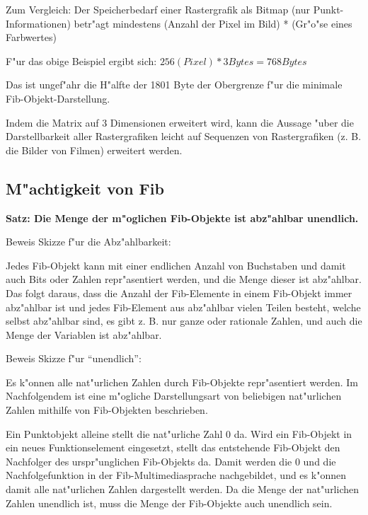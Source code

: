 \begin{flushleft}
\bigskip\noindent
Zum Vergleich: Der Speicherbedarf einer Rastergrafik als Bitmap (nur Punkt-Informationen) betr"agt mindestens
(Anzahl der Pixel im Bild) * (Gr"o"se eines Farbwertes)

\bigskip\noindent
F"ur das obige Beispiel ergibt sich: $256 (Pixel) * 3 Bytes = 768 Bytes$

\bigskip\noindent
Das ist ungef"ahr die H"alfte der 1801 Byte der Obergrenze f"ur die minimale Fib-Objekt-Darstellung.

\bigskip\noindent
Indem die Matrix auf 3 Dimensionen erweitert wird, kann die Aussage "uber die Darstellbarkeit aller Rastergrafiken leicht auf Sequenzen von Rastergrafiken (z. B. die Bilder von Filmen) erweitert werden.

\end{flushleft}


\subsection{M"achtigkeit von Fib}

\textbf{Satz: Die Menge der m"oglichen Fib-Objekte ist abz"ahlbar unendlich.}

\bigskip\noindent
Beweis Skizze f"ur die Abz"ahlbarkeit:

\noindent
Jedes Fib-Objekt kann mit einer endlichen Anzahl von Buchstaben und damit auch Bits oder Zahlen repr"asentiert werden, und die Menge dieser ist abz"ahlbar.
Das folgt daraus, dass die Anzahl der Fib-Elemente in einem Fib-Objekt immer abz"ahlbar ist und jedes Fib-Element aus abz"ahlbar vielen Teilen besteht, welche selbst abz"ahlbar sind, es gibt z. B. nur ganze oder rationale Zahlen, und auch die Menge der Variablen ist abz"ahlbar.

\bigskip\noindent
Beweis Skizze f"ur ``unendlich'':

\noindent
Es k"onnen alle nat"urlichen Zahlen durch Fib-Objekte repr"asentiert werden. Im Nachfolgendem ist eine m"ogliche Darstellungsart von beliebigen nat"urlichen Zahlen mithilfe von Fib-Objekten beschrieben.

Ein Punktobjekt alleine stellt die nat"urliche Zahl 0 da.
Wird ein Fib-Objekt in ein neues Funktionselement eingesetzt, stellt das entstehende Fib-Objekt den Nachfolger des urspr"unglichen Fib-Objekts da.
Damit werden die 0 und die Nachfolgefunktion in der Fib-Multimediasprache nachgebildet, und es k"onnen damit alle nat"urlichen Zahlen dargestellt werden. Da die Menge der nat"urlichen Zahlen unendlich ist, muss die Menge der Fib-Objekte auch unendlich sein.

